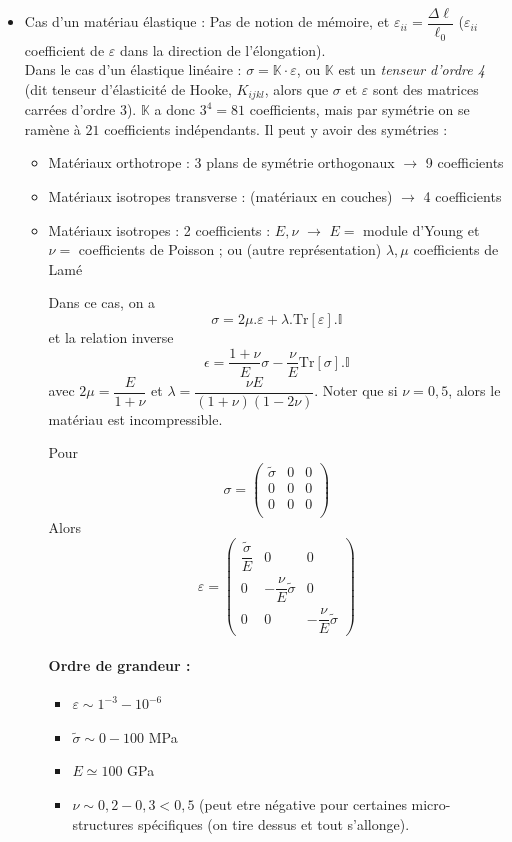 \documentclass{article}
\begin{document}
\begin{itemize}
\item Cas d'un matériau élastique : Pas de notion de mémoire, et $\varepsilon_{ii} = \dfrac{\Delta \ell}{\ell_0}$ ($\varepsilon_{ii}$ coefficient de $\varepsilon$ dans la direction de l'élongation).\\
Dans le cas d'un élastique linéaire : $\sigma = \mathbb{K}\cdot\varepsilon$, ou $\mathbb{K}$ est un \emph{tenseur d'ordre 4} (dit tenseur d'élasticité de Hooke, $K_{ijkl}$, alors que $\sigma$ et $\varepsilon$ sont des matrices carrées d'ordre 3). $\mathbb{K}$ a donc $3^4=81$ coefficients, mais par symétrie on se ramène à $21$ coefficients indépendants. Il peut y avoir des symétries :
\begin{itemize}[label=\textbullet]
\item Matériaux orthotrope : 3 plans de symétrie orthogonaux $\to$ 9 coefficients
\item Matériaux isotropes transverse : (matériaux en couches) $\to$ 4 coefficients
\item Matériaux isotropes : 2 coefficients : $E,\nu$ $\to$ $E=$ module d'Young et $\nu=$ coefficients de Poisson ; ou (autre représentation) $\lambda,\mu$ coefficients de Lamé

Dans ce cas, on a
\[\sigma = 2\mu.\varepsilon + \lambda.\text{Tr}[\varepsilon].\mathbb{I}\]
et la relation inverse
\[\epsilon = \dfrac{1+\nu}{E}\sigma - \dfrac{\nu}{E}\text{Tr}[\sigma].\mathbb{I}\]
avec $2\mu = \dfrac{E}{1+\nu}$ et $\lambda = \dfrac{\nu E}{(1+\nu)(1-2\nu)}$. Noter que si $\nu = 0,5$, alors le matériau est incompressible.

Pour
\[
\sigma = \begin{pmatrix}
\tilde{\sigma} & 0 & 0\\
0 & 0 & 0\\
0 & 0 & 0\\
\end{pmatrix}
\]
Alors 
\[\varepsilon = 
\begin{pmatrix}
\dfrac{\tilde{\sigma}}{E} & 0 & 0\\
0 & -\dfrac{\nu}{E}\tilde{\sigma} & 0\\
0 & 0 & -\dfrac{\nu}{E}\tilde{\sigma}
\end{pmatrix}
\]
\paragraph{Ordre de grandeur :}
\begin{itemize}[label=$\star$]
\item $\varepsilon \sim 1^{-3}-10^{-6}$
\item $\tilde{\sigma}\sim 0-100$ MPa
\item $E \simeq 100$ GPa
\item $\nu \sim 0,2 - 0,3 < 0,5$ (peut etre négative pour certaines micro-structures spécifiques (on tire dessus et tout s'allonge).
\end{itemize}
\end{itemize}
\end{itemize}
\end{document}
